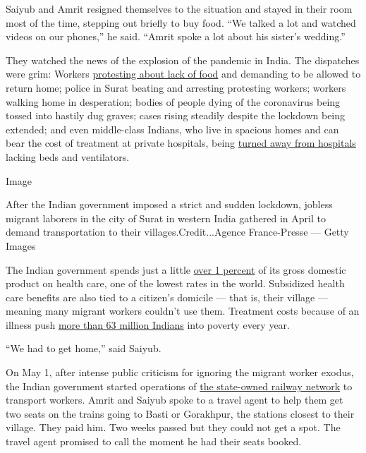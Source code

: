 Saiyub and Amrit resigned themselves to the situation and stayed in
their room most of the time, stepping out briefly to buy food. ``We
talked a lot and watched videos on our phones,'' he said. ``Amrit spoke
a lot about his sister's wedding.''

They watched the news of the explosion of the pandemic in India. The
dispatches were grim: Workers
\href{https://www.thehindu.com/news/national/other-states/migrant-workers-in-surat-take-to-the-streets-again/article31341846.ece}{protesting
about lack of food} and demanding to be allowed to return home; police
in Surat beating and arresting protesting workers; workers walking home
in desperation; bodies of people dying of the coronavirus being tossed
into hastily dug graves; cases rising steadily despite the lockdown
being extended; and even middle-class Indians, who live in spacious
homes and can bear the cost of treatment at private hospitals, being
\href{https://www.nytimes.com/2020/06/21/world/asia/coronavirus-india-hospitals-pregnant.html}{turned
away from hospitals} lacking beds and ventilators.

Image

After the Indian government imposed a strict and sudden lockdown,
jobless migrant laborers in the city of Surat in western India gathered
in April to demand transportation to their villages.Credit...Agence
France-Presse --- Getty Images

The Indian government spends just a little
\href{https://main.mohfw.gov.in/sites/default/files/NHA_Estimates_Report_2015-16_0.pdf}{over
1 percent} of its gross domestic product on health care, one of the
lowest rates in the world. Subsidized health care benefits are also tied
to a citizen's domicile --- that is, their village --- meaning many
migrant workers couldn't use them. Treatment costs because of an illness
push
\href{https://www.indiaspend.com/wp-content/uploads/2020/06/Draft_National_Hea_2263179a.pdf}{more
than 63 million Indians} into poverty every year.

``We had to get home,'' said Saiyub.

On May 1, after intense public criticism for ignoring the migrant worker
exodus, the Indian government started operations of
\href{https://timesofindia.indiatimes.com/videos/news/covid-19-lockdown-indian-railways-starts-first-special-train-for-migrant-workers-from-hyderabad-to-jharkhand/videoshow/75487379.cms}{the
state-owned railway network} to transport workers. Amrit and Saiyub
spoke to a travel agent to help them get two seats on the trains going
to Basti or Gorakhpur, the stations closest to their village. They paid
him. Two weeks passed but they could not get a spot. The travel agent
promised to call the moment he had their seats booked.

